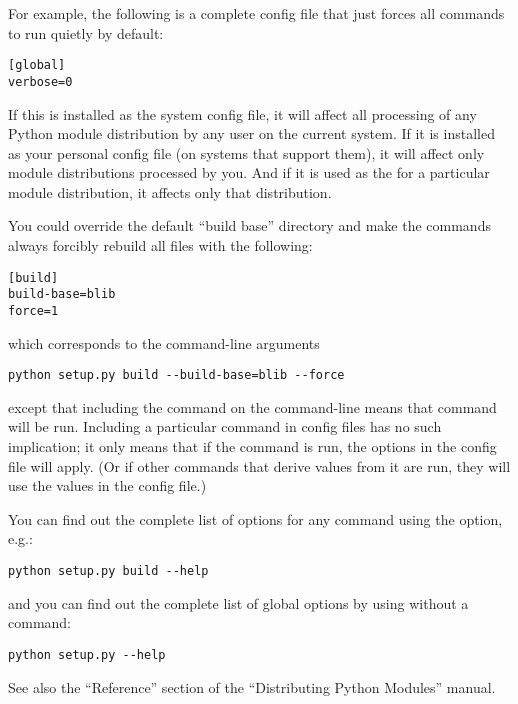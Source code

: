 \documentclass{howto}
\begin{document}
For example, the following is a complete config file that just forces
all commands to run quietly by default:

\begin{verbatim}
[global]
verbose=0
\end{verbatim}

If this is installed as the system config file, it will affect all
processing of any Python module distribution by any user on the current
system.  If it is installed as your personal config file (on systems
that support them), it will affect only module distributions processed
by you.  And if it is used as the  for a particular
module distribution, it affects only that distribution.

You could override the default ``build base'' directory and make the
 commands always forcibly rebuild all files with the
following:

\begin{verbatim}
[build]
build-base=blib
force=1
\end{verbatim}

which corresponds to the command-line arguments

\begin{verbatim}
python setup.py build --build-base=blib --force
\end{verbatim}

except that including the  command on the command-line
means that command will be run.  Including a particular command in
config files has no such implication; it only means that if the command
is run, the options in the config file will apply.  (Or if other
commands that derive values from it are run, they will use the values in
the config file.)

You can find out the complete list of options for any command using the
 option, e.g.:

\begin{verbatim}
python setup.py build --help
\end{verbatim}

and you can find out the complete list of global options by using
 without a command:

\begin{verbatim}
python setup.py --help
\end{verbatim}

See also the ``Reference'' section of the ``Distributing Python
Modules'' manual.
\end{document}
